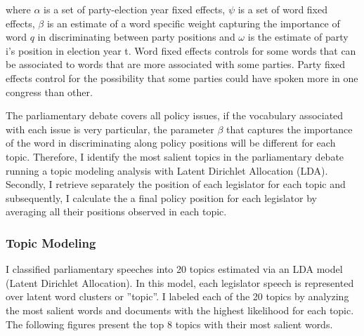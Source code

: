 \documentclass{article}
\begin{document}
where $\alpha$ is a set of party-election year fixed effects, $\psi$ is a set of word fixed effects,  $\beta$ is an estimate of a word specific weight capturing the importance of word $q$ in discriminating between party positions and $\omega$ is the estimate of party i's position in election year t. Word fixed effects controls for some words that can be associated to words that are more associated with some parties. Party fixed effects control for the possibility that some parties could have spoken more in one congress than other. 

The parliamentary debate covers all policy issues, if the vocabulary associated with each issue is very particular, the parameter $\beta$  that captures the importance of the word in discriminating along policy positions will be different for each topic. Therefore, I identify the most salient topics in the parliamentary debate running a topic modeling analysis with Latent Dirichlet Allocation (LDA). Secondly, I retrieve separately the position of each legislator for each topic and subsequently, I calculate the a final policy position for each legislator by averaging all their positions observed in each topic. 

\subsubsection{Topic Modeling}

I classified parliamentary speeches into 20 topics estimated via an LDA model (Latent Dirichlet Allocation). In this model, each legislator speech is represented over latent word clusters or ”topic”. I labeled each of the 20 topics by analyzing the most salient words and documents with the highest likelihood for each topic. The following figures present the top 8 topics with their most salient words. 
\end{document}

